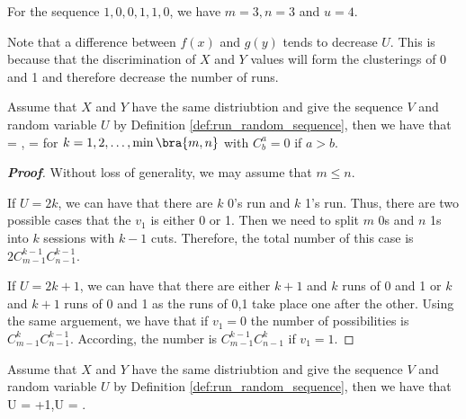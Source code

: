 \begin{example}
For the sequence $1,0,0,1,1,0$, we have $m=3,n=3$ and $u=4$.
\end{example}

\begin{remark}
Note that a difference between $f(x)$ and $g(y)$ tends to decrease $U$. This is because that the discrimination of $X$ and $Y$ values will form the clusterings of 0 and 1 and therefore decrease the number of runs. 
\end{remark}

\begin{theorem}\label{thm:run_probability}
Assume that $X$ and $Y$ have the same distriubtion and give the sequence $V$ and random variable $U$ by Definition \ref{def:run_random_sequence}, then we have that
\be
\pro{} = ,\qquad \pro{} = 
\ee
for $k = 1,2,\dots,\min\bra{m,n}$ with $C^a_b =0$ if $a>b$. 
\end{theorem}

\begin{proof}[\bf Proof]
Without loss of generality, we may assume that $m\leq n$.

If $U = 2k$, we can have that there are $k$ 0's run and $k$ 1's run. Thus, there are two possible cases that the $v_1$ is either 0 or 1.  Then we need to split $m$ 0s and $n$ 1s into $k$ sessions with $k-1$ cuts. Therefore, the total number of this case is $2C^{k-1}_{m-1}C^{k-1}_{n-1}$.

If $U = 2k+1$, we can have that there are either $k+1$ and $k$ runs of 0 and 1 or  $k$ and $k+1$ runs of 0 and 1 as the runs of 0,1 take place one after the other. Using the same arguement, we have that if $v_1=0$ the number of possibilities is $C^k_{m-1}C^{k-1}_{n-1}$. According, the number is $C^{k-1}_{m-1}C^{k}_{n-1}$ if $v_1 =1$.
\end{proof}

\begin{theorem}
Assume that $X$ and $Y$ have the same distriubtion and give the sequence $V$ and random variable $U$ by Definition \ref{def:run_random_sequence}, then we have that
\be
\E U = +1,\qquad \var U = .
\ee
\end{theorem}

